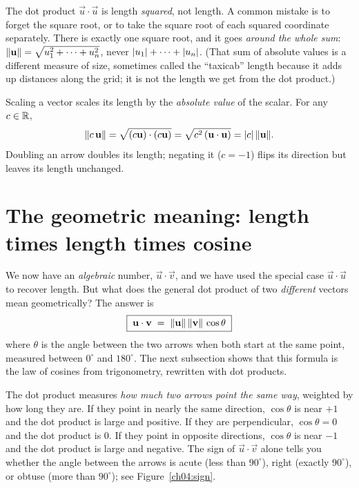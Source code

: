 \begin{trapbox}
The dot product $\vec u\cdot\vec u$ is length \emph{squared}, not length. A common
mistake is to forget the square root, or to take the square root of each squared
coordinate separately. There is exactly one square root, and it goes
\emph{around the whole sum}: $\lVert\mathbf{u}\rVert=\sqrt{u_1^2+\cdots+u_n^2}$, never
$\lvert u_1\rvert+\cdots+\lvert u_n\rvert$. (That sum of absolute values is a different measure of
size, sometimes called the ``taxicab'' length because it adds up distances along the
grid; it is not the length we get from the dot product.)
\end{trapbox}

Scaling a vector scales its length by the
\emph{absolute value} of the scalar. For any $c\in\mathbb{R}$,
\[
  \lVert c\,\mathbf{u}\rVert = \sqrt{(c\mathbf{u})\cdot(c\mathbf{u})}
                   = \sqrt{c^2\,(\mathbf{u}\cdot\mathbf{u})}
                   = \lvert c\rvert\,\lVert\mathbf{u}\rVert.
\]
Doubling an arrow doubles its length; negating it ($c=-1$) flips its direction but
leaves its length unchanged.

\section{The geometric meaning: length times length times cosine}

We now have an \emph{algebraic} number, $\vec u\cdot\vec v$, and we have used the
special case $\vec u\cdot\vec u$ to recover length. But what does the general dot
product of two \emph{different} vectors mean geometrically? The answer is
\[
  \boxed{\;\mathbf{u}\cdot\mathbf{v} \;=\; \lVert\mathbf{u}\rVert\,\lVert\mathbf{v}\rVert\,\cos\theta\;}
\]
where $\theta$ is the angle between the two arrows when both start at the same
point, measured between $0^\circ$ and $180^\circ$. The next subsection shows that
this formula is the law of cosines from trigonometry, rewritten with dot products.

\begin{intuitionbox}
The dot product measures \emph{how much two arrows point the same way}, weighted by
how long they are. If they point in nearly the same direction, $\cos\theta$ is near
$+1$ and the dot product is large and positive. If they are perpendicular,
$\cos\theta = 0$ and the dot product is $0$. If they point in opposite directions,
$\cos\theta$ is near $-1$ and the dot product is large and negative. The sign of
$\vec u\cdot\vec v$ alone tells you whether the angle between the arrows is acute
(less than $90^\circ$), right (exactly $90^\circ$), or obtuse (more than $90^\circ$);
see Figure~\ref{ch04:sign}.
\end{intuitionbox}

